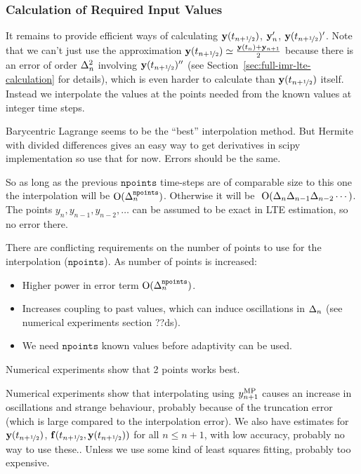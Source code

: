 \subsubsection{Calculation of Required Input Values}
\label{sec:calc-requ-input}

It remains to provide efficient ways of calculating $\mathbf{y}(t_{n+\nicefrac{1}{2}})$, $\mathbf{y}_n'$, $\mathbf{y}(t_{n+\nicefrac{1}{2}})'$.
Note that we can't just use the approximation $\mathbf{y}(t_{n+\nicefrac{1}{2}}) \simeq \frac{\mathbf{y}(t_n) + \mathbf{y}_{n+1}}{2}$ because there is an error of order $\Delta_{n}^2$ involving $\mathbf{y}(t_{n+\nicefrac{1}{2}})''$ (see Section~\ref{sec:full-imr-lte-calculation} for details), which is even harder to calculate than $\mathbf{y}(t_{n+\nicefrac{1}{2}})$ itself. Instead we interpolate the values at the points needed from the known values at integer time steps.

Barycentric Lagrange seems to be the ``best'' interpolation method.\cite{Berrut2004}
But Hermite with divided differences gives an easy way to get derivatives in scipy implementation so use that for now.
Errors should be the same.

So as long as the previous $\texttt{npoints}$ time-steps are of comparable size to this one the interpolation will be $\text{O}(\Delta_{n}^\texttt{npoints})$.
Otherwise it will be $~\text{O}(\Delta_{n} \Delta_{n-1} \Delta_{n-2}\cdots)$.
The points $y_n, y_{n-1}, y_{n-2}, \ldots$ can be assumed to be exact in LTE estimation, so no error there.


There are conflicting requirements on the number of points to use for the interpolation ($\texttt{npoints}$). As number of points is increased:
\begin{itemize}
\item Higher power in error term $\text{O}(\Delta_{n}^\texttt{npoints})$.
\item Increases coupling to past values, which can induce oscillations in $\Delta_{n}$ (see numerical experiments section ??ds).
\item We need $\texttt{npoints}$ known values before adaptivity can be used.
\end{itemize}
Numerical experiments show that 2 points works best.


Numerical experiments show that interpolating using $y_{n+1}^{\text{MP}}$ causes an increase in oscillations and strange behaviour, probably because of the truncation error (which is large compared to the interpolation error).
We also have estimates for $\mathbf{y}(t_{n+\nicefrac{1}{2}})$, ${\mathbf{f}}(t_{n+\nicefrac{1}{2}}, \mathbf{y}(t_{n+\nicefrac{1}{2}}))$ for all $n \leq n+1$, with low accuracy, probably no way to use these..
Unless we use some kind of least squares fitting, probably too expensive.


